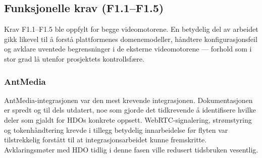 \subsection{Funksjonelle krav (F1.1--F1.5)}
\label{sec:eval-funksjonelle}


Krav F1.1--F1.5 ble oppfylt for begge videomotorene. En betydelig del av arbeidet gikk likevel til å forstå plattformenes domenemodeller, håndtere konfigurasjonsfeil og avklare uventede begrensninger i de eksterne videomotorene — forhold som i stor grad lå utenfor prosjektets kontrollsfære.


\subsubsection{AntMedia}
\label{subsec:eval-ant}

AntMedia-integrasjonen var den mest krevende integrasjonen. Dokumentasjonen er spredt og til dels utdatert, noe som gjorde det tidkrevende å identifisere hvilke deler som gjaldt for HDOs konkrete oppsett. WebRTC-signalering, strømstyring og tokenhåndtering krevde i tillegg betydelig innarbeidelse før flyten var tilstrekkelig forstått til at integrasjonsarbeidet kunne fremskritte. Avklaringsmøter med HDO tidlig i denne fasen ville redusert tidsbruken vesentlig.


